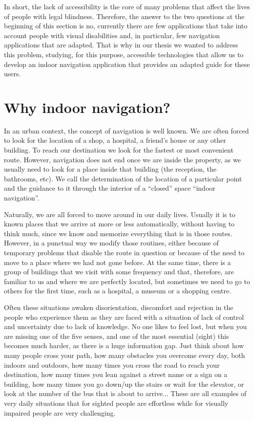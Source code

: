 In short, the lack of accessibility is the core of many problems that affect the lives of people with legal blindness. Therefore, the answer to the two questions at the beginning of this section is no, currently there are few applications that take into account people with visual disabilities and, in particular, few navigation applications that are adapted. That is why in our thesis we wanted to address this problem, studying, for this purpose, accessible technologies that allow us to develop an indoor navigation application that provides an adapted guide for these users.

\section{Why indoor navigation?}

In an urban context, the concept of navigation is well known. We are often forced to look for the location of a shop, a hospital, a friend's house or any other building. To reach our destination we look for the fastest or most convenient route. However, navigation does not end once we are inside the property, as we usually need to look for a place inside that building (the reception, the bathrooms, etc). We call the determination of the location of a particular point and the guidance to it through the interior of a ``closed'' space ``indoor navigation''.

Naturally, we are all forced to move around in our daily lives. Usually it is to known places that we arrive at more or less automatically, without having to think much, since we know and memorize everything that is in those routes. However, in a punctual way we modify those routines, either because of temporary problems that disable the route in question or because of the need to move to a place where we had not gone before. At the same time, there is a group of buildings that we visit with some frequency and that, therefore, are familiar to us and where we are perfectly located, but sometimes we need to go to others for the first time, such as a hospital, a museum or a shopping centre. 

Often these situations awaken disorientation, discomfort and rejection in the people who experience them as they are faced with a situation of lack of control and uncertainty due to lack of knowledge. No one likes to feel lost, but when you are missing one of the five senses, and one of the most essential (sight) this becomes much harder, as there is a huge information gap. Just think about how many people cross your path, how many obstacles you overcome every day, both indoors and outdoors, how many times you cross the road to reach your destination, how many times you lean against a street name or a sign on a building, how many times you go down/up the stairs or wait for the elevator, or look at the number of the bus that is about to arrive... These are all examples of very daily situations that for sighted people are effortless while for visually impaired people are very challenging. 

